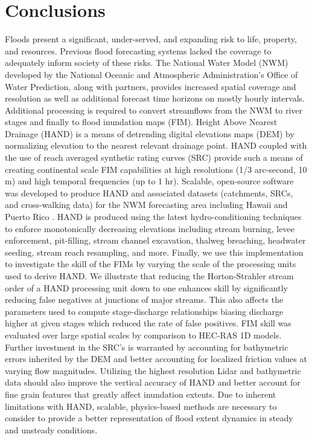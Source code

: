 \section{Conclusions}
\label{sec:conclusions}
%
Floods present a significant, under-served, and expanding risk to life, property, and resources.
Previous flood forecasting systems lacked the coverage to adequately inform society of these risks.
The National Water Model (NWM) developed by the National Oceanic and Atmospheric Administration's Office of Water Prediction, along with partners, provides increased spatial coverage and resolution as well as additional forecast time horizons on mostly hourly intervals.
Additional processing is required to convert streamflows from the NWM to river stages and finally to flood inundation maps (FIM).
Height Above Nearest Drainage (HAND) is a means of detrending digital elevations maps (DEM) by normalizing elevation to the nearest relevant drainage point.
HAND coupled with the use of reach averaged synthetic rating curves (SRC) provide such a means of creating continental scale FIM capabilities at high resolutions (1/3 arc-second, 10 m) and high temporal frequencies (up to 1 hr).
Scalable, open-source software was developed to produce HAND and associated datasets (catchments, SRCs, and cross-walking data) for the NWM forecasting area including Hawaii and Puerto Rico \cite{inundationMapping2022}.
HAND is produced using the latest hydro-conditioning techniques to enforce monotonically decreasing elevations including stream burning, levee enforcement, pit-filling, stream channel excavation, thalweg breaching, headwater seeding, stream reach resampling, and more. 
Finally, we use this implementation to investigate the skill of the FIMs by varying the scale of the processing units used to derive HAND.
We illustrate that reducing the Horton-Strahler stream order of a HAND processing unit down to one enhances skill by significantly reducing false negatives at junctions of major streams.
This also affects the parameters used to compute stage-discharge relationships biasing discharge higher at given stages which reduced the rate of false positives.
FIM skill was evaluated over large spatial scales by comparison to HEC-RAS 1D models.
Further investment in the SRC's is warranted by accounting for bathymetric errors inherited by the DEM and better accounting for localized friction values at varying flow magnitudes.
Utilizing the highest resolution Lidar and bathymetric data should also improve the vertical accuracy of HAND and better account for fine grain features that greatly affect inundation extents.
Due to inherent limitations with HAND, scalable, physics-based methods are necessary to consider to provide a better representation of flood extent dynamics in steady and unsteady conditions. 
%
